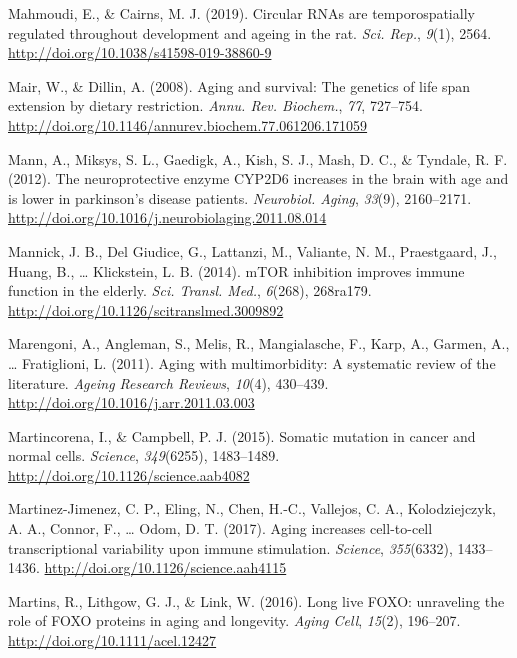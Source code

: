 \documentclass[12pt,twoside]{unicam}
\begin{document}
\begin{cslreferences}
\leavevmode\hypertarget{ref-Mahmoudi2019}{}%
Mahmoudi, E., \& Cairns, M. J. (2019). Circular RNAs are temporospatially regulated throughout development and ageing in the rat. \emph{Sci. Rep.}, \emph{9}(1), 2564. \url{http://doi.org/10.1038/s41598-019-38860-9}

\leavevmode\hypertarget{ref-Mair2008}{}%
Mair, W., \& Dillin, A. (2008). Aging and survival: The genetics of life span extension by dietary restriction. \emph{Annu. Rev. Biochem.}, \emph{77}, 727--754. \url{http://doi.org/10.1146/annurev.biochem.77.061206.171059}

\leavevmode\hypertarget{ref-Mann2012}{}%
Mann, A., Miksys, S. L., Gaedigk, A., Kish, S. J., Mash, D. C., \& Tyndale, R. F. (2012). The neuroprotective enzyme CYP2D6 increases in the brain with age and is lower in parkinson's disease patients. \emph{Neurobiol. Aging}, \emph{33}(9), 2160--2171. \url{http://doi.org/10.1016/j.neurobiolaging.2011.08.014}

\leavevmode\hypertarget{ref-Mannick2014}{}%
Mannick, J. B., Del Giudice, G., Lattanzi, M., Valiante, N. M., Praestgaard, J., Huang, B., \ldots{} Klickstein, L. B. (2014). mTOR inhibition improves immune function in the elderly. \emph{Sci. Transl. Med.}, \emph{6}(268), 268ra179. \url{http://doi.org/10.1126/scitranslmed.3009892}

\leavevmode\hypertarget{ref-Marengoni2011}{}%
Marengoni, A., Angleman, S., Melis, R., Mangialasche, F., Karp, A., Garmen, A., \ldots{} Fratiglioni, L. (2011). Aging with multimorbidity: A systematic review of the literature. \emph{Ageing Research Reviews}, \emph{10}(4), 430--439. \url{http://doi.org/10.1016/j.arr.2011.03.003}

\leavevmode\hypertarget{ref-Martincorena2015}{}%
Martincorena, I., \& Campbell, P. J. (2015). Somatic mutation in cancer and normal cells. \emph{Science}, \emph{349}(6255), 1483--1489. \url{http://doi.org/10.1126/science.aab4082}

\leavevmode\hypertarget{ref-Martinez-Jimenez2017}{}%
Martinez-Jimenez, C. P., Eling, N., Chen, H.-C., Vallejos, C. A., Kolodziejczyk, A. A., Connor, F., \ldots{} Odom, D. T. (2017). Aging increases cell-to-cell transcriptional variability upon immune stimulation. \emph{Science}, \emph{355}(6332), 1433--1436. \url{http://doi.org/10.1126/science.aah4115}

\leavevmode\hypertarget{ref-Martins2016}{}%
Martins, R., Lithgow, G. J., \& Link, W. (2016). Long live FOXO: unraveling the role of FOXO proteins in aging and longevity. \emph{Aging Cell}, \emph{15}(2), 196--207. \url{http://doi.org/10.1111/acel.12427}


\end{cslreferences}
\end{document}
